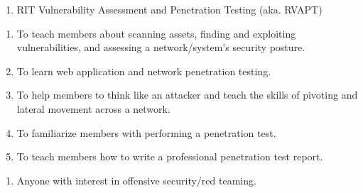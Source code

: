 

\begin{enumerate}
	\item RIT Vulnerability Assessment and Penetration Testing (aka. RVAPT)
\end{enumerate}


\begin{enumerate}
	\item To teach members about scanning assets, finding and exploiting vulnerabilities,
	      and assessing a network/system's security posture.
	\item To learn web application and network penetration testing.
	\item To help members to think like an attacker and teach the skills of pivoting and
	      lateral movement across a network.
	\item To familiarize members with performing a penetration test.
	\item To teach members how to write a professional penetration test report.
\end{enumerate}


\begin{enumerate}
	\item Anyone with interest in offensive security/red teaming.
\end{enumerate}